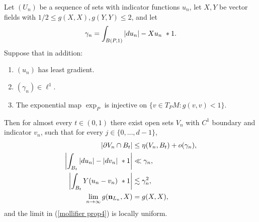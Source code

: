 \begin{lemma}\label{mollifier proposition}
Let $(U_n)$ be a sequence of sets with indicator functions $u_n$, let $X, Y$ be vector fields with $1/2 \leq g(X, X), g(Y, Y) \leq 2$, and let
$$\gamma_n = \int_{B(P, 1)} |du_n| - Xu_n ~*1.$$
Suppose that in addition:
\begin{enumerate}
\item $(u_n)$ has least gradient.
\item $(\gamma_n) \in \ell^1$.
\item The exponential map $\exp_P$ is injective on $\{v \in T_PM: g(v, v) < 1\}$.
\end{enumerate}

Then for almost every $t \in (0, 1)$ there exist open sets $V_n$ with $C^1$ boundary and indicator $v_n$, such that for every $j \in \{0, \dots, d - 1\}$,
\begin{align}
|\partial V_n \cap B_t| &\leq \eta(V_n, B_t) + o(\gamma_n), \label{mollifier prop1}\\
\left|\int_{B_t} |du_n| - |dv_n| ~*1\right| &\ll \gamma_n, \label{mollifier prop2}\\
\left|\int_{B_t} Y(u_n - v_n)~*1\right| &\lesssim \gamma_n^2, \label{mollifier prop3}\\
\lim_{n \to \infty} g(\mathbf n_{L_n}, X) &= g(X, X), \label{mollifier prop4}
\end{align}
and the limit in (\ref{mollifier prop4}) is locally uniform.
\end{lemma}


